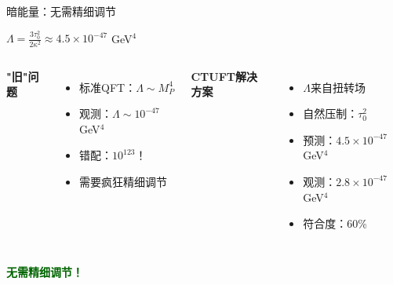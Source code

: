 \documentclass[aspectratio=169]{beamer}
\begin{document}
\begin{frame}{暗能量：无需精细调节}
\begin{center}
\Large
$\Lambda = \frac{3\tau_0^2}{2\kappa^2} \approx 4.5 \times 10^{-47}$ GeV$^4$
\end{center}

\vspace{0.5cm}

\begin{columns}
\textbf{"旧"问题}
\begin{itemize}
    \item 标准QFT：$\Lambda \sim M_P^4$
    \item 观测：$\Lambda \sim 10^{-47}$ GeV$^4$
    \item 错配：$10^{123}$！
    \item 需要疯狂精细调节
\end{itemize}

\textbf{CTUFT解决方案}
\begin{itemize}
    \item $\Lambda$来自扭转场
    \item 自然压制：$\tau_0^2$
    \item 预测：$4.5\times 10^{-47}$ GeV$^4$
    \item 观测：$2.8\times 10^{-47}$ GeV$^4$
    \item 符合度：60\%
\end{itemize}
\end{columns}

\vspace{0.5cm}
\begin{center}
\textcolor{darkgreen}{\textbf{无需精细调节！}}
\end{center}
\end{frame}
\end{document}
